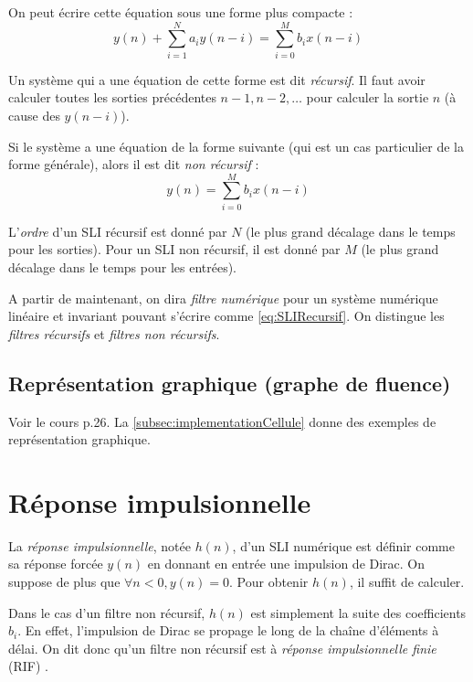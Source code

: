         On peut écrire cette équation sous une forme plus compacte :
        \begin{equation}
            y(n) + \sum_{i=1}^N a_i y(n-i) = \sum_{i=0}^M b_i x(n-i)
            \label{eq:SLIRecursif}
        \end{equation}

        Un système qui a une équation de cette forme est dit \textit{récursif}. Il faut avoir calculer toutes les sorties précédentes $n-1, n-2, \dots$ pour calculer la sortie $n$ (à cause des $y(n-i)$).

        Si le système a une équation de la forme suivante (qui est un cas particulier de la forme générale), alors il est dit \textit{non récursif} :
        \begin{equation}
            y(n) = \sum_{i=0}^M b_i x(n-i)
            \label{eq:SLINonRecursif}
        \end{equation}

        L'\textit{ordre} d'un SLI récursif est donné par $N$ (le plus grand décalage dans le temps pour les sorties). Pour un SLI non récursif, il est donné par $M$ (le plus grand décalage dans le temps pour les entrées).

        A partir de maintenant, on dira \textit{filtre numérique} pour un système numérique linéaire et invariant pouvant s'écrire comme \eqref{eq:SLIRecursif}. On distingue les \textit{filtres récursifs} et \textit{filtres non récursifs}.

        \subsection{Représentation graphique (graphe de fluence)}
            Voir le cours p.26. La \autoref{subsec:implementationCellule} donne des exemples de représentation graphique.

    \section{Réponse impulsionnelle}
        La \textit{réponse impulsionnelle}, notée $h(n)$, d'un SLI numérique est définir comme sa réponse forcée $y(n)$ en donnant en entrée une impulsion de Dirac. On suppose de plus que $\forall n < 0, y(n) = 0$. Pour obtenir $h(n)$, il suffit de calculer.

        Dans le cas d'un filtre non récursif, $h(n)$ est simplement la suite des coefficients $b_i$. En effet, l'impulsion de Dirac se propage le long de la chaîne d'éléments à délai. On dit donc qu'un filtre non récursif est à \textit{réponse impulsionnelle finie} (RIF) .

